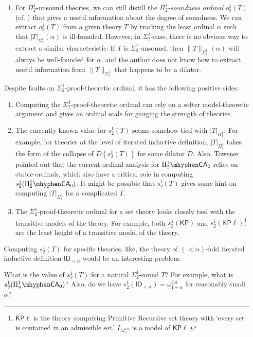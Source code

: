 \documentclass{mhkr}
\newcommand{\CK}{\mathsf{CK}}
\newcommand{\CA}{\mathsf{CA}}
\newcommand{\KP}{\mathsf{KP}}
\begin{document}
\begin{enumerate}
    \item For $\Pi^1_2$-unsound theories, we can still distill the \emph{$\Pi^1_2$-soundness ordinal $o^1_2(T)$} (cf. \cite[\S 4]{AguileraPakhomov2023Pi12}) that gives a useful information about the degree of soundness. We can extract $o^1_2(T)$ from a given theory $T$ by tracking the least ordinal $\alpha$ such that $|T|_{\Pi^1_2}(\alpha)$ is ill-founded.
    However, in $\Sigma^1_2$-case, there is no obvious way to extract a similar characteristic: If $T$ is $\Sigma^1_2$-unsound, then $\|T\|_{\Sigma^1_2}(\alpha)$ will always be well-founded for $\alpha$, and the author does not know how to extract useful information from $\|T\|_{\Sigma^1_2}$ that happens to be a dilator.
\end{enumerate}

Despite faults on $\Sigma^1_2$-proof-theoretic ordinal, it has the following positive sides:
\begin{enumerate}
    \item Computing the $\Sigma^1_2$-proof-theoretic ordinal can rely on a softer model-theoretic argument and gives an ordinal scale for gauging the strength of theories.
    
    \item The currently known value for $s^1_2(T)$ seems somehow tied with $|T|_{\Pi^1_1}$: For example, for theories at the level of iterated inductive definition, $|T|_{\Pi^1_1}$ takes the form of the collapse of $D(s^1_2(T))$ for some dilator $D$. 
    Also, Towsner pointed out that the current ordinal analysis for $\Pi^1_2\mhyphen\CA_0$ relies on stable ordinals, which also have a critical role in computing $s^1_2(\Pi^1_2\mhyphen\CA_0)$.
    It might be possible that $s^1_2(T)$ gives some hint on computing $|T|_{\Pi^1_1}$ for a complicated $T$. 
    
    \item The $\Sigma^1_2$-proof-theoretic ordinal for a set theory looks closely tied with the transitive models of the theory. For example, both $s^1_2(\KP)$ and $s^1_2(\KP\ell)$\footnote{$\KP\ell$ is the theory comprising Primitive Recursive set theory with `every set is contained in an admissible set.' $L_{\omega_\omega^\CK}$ is a model of $\KP\ell$.} are the least height of a transitive model of the theory. 
\end{enumerate}

Computing $s^1_2(T)$ for specific theories, like, the theory of $(<\alpha)$-fold iterated inductive definition $\mathsf{ID}_{<\alpha}$ would be an interesting problem:
\begin{question}
    What is the value of $s^1_2(T)$ for a natural $\Sigma^1_2$-sound $T$? For example, what is $s^1_2(\Pi^1_n\mhyphen\CA_0)$? Also, do we have $s^1_2(\mathsf{ID}_{<\alpha})=\omega_{1+\alpha}^\CK$ for reasonably small $\alpha$?
\end{question}
\end{document}

